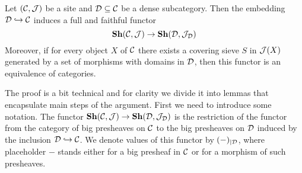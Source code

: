 \begin{theorem}\label{theorem:densesubcategoriesandsheaves}
Let $\left({\mathcal C},{\mathcal J}\right)$ be a site and ${\mathcal D}\subseteq {\mathcal C}$ be a dense subcategory. Then the embedding ${\mathcal D} \hookrightarrow {\mathcal C}$ induces a full and faithful functor
$$\mathbf{Sh}({\mathcal C},{\mathcal J})\rightarrow \mathbf{Sh}({\mathcal D},{\mathcal J}_{{\mathcal D}})$$
Moreover, if for every object $X$ of ${\mathcal C}$ there exists a covering sieve $S$ in ${\mathcal J}(X)$ generated by a set of morphisms with domains in ${\mathcal D}$, then this functor is an equivalence of categories.
\end{theorem}
\noindent
The proof is a bit technical and for clarity we divide it into lemmas that encapsulate main steps of the argument. First we need to introduce some notation. The functor $\mathbf{Sh}({\mathcal C},{\mathcal J})\rightarrow \mathbf{Sh}({\mathcal D},{\mathcal J}_{{\mathcal D}})$ is the restriction of the functor from the category of big presheaves on ${\mathcal C}$ to the big presheaves on ${\mathcal D}$ induced by the inclusion ${\mathcal D}\hookrightarrow {\mathcal C}$. We denote values of this functor by $(-)_{\mid {\mathcal D}}$, where placeholder $-$ stands either for a big presheaf in ${\mathcal C}$ or for a morphism of such presheaves.

